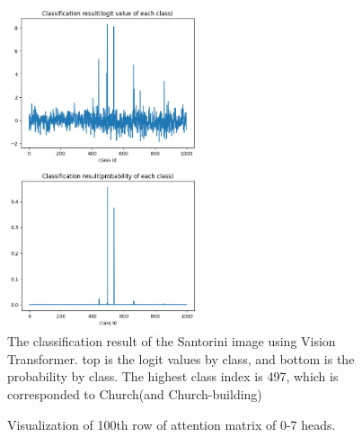 \documentclass[extendedabs]{bmvc2k}
\begin{document}
\begin{figure}[thb] \centering
    
    \includegraphics[width=0.5\textwidth]{images/fig8.png}
    
    \includegraphics[width=0.5\textwidth]{images/fig9.png} 
    
    \caption{The classification result of the Santorini image using Vision Transformer. top is the logit values by class, and bottom is the probability by class. The highest class index is 497, which is corresponded to Church(and Church-building)} \label{fig:classificationres}
\end{figure}

\begin{figure}[t]
\centering
{}
	
	\caption{
		Visualization of 100th row of attention matrix of 0-7 heads.}
	\vspace{-2mm}
        \label{fig:attentionvis2}
\end{figure}

\newpage

\end{document}
